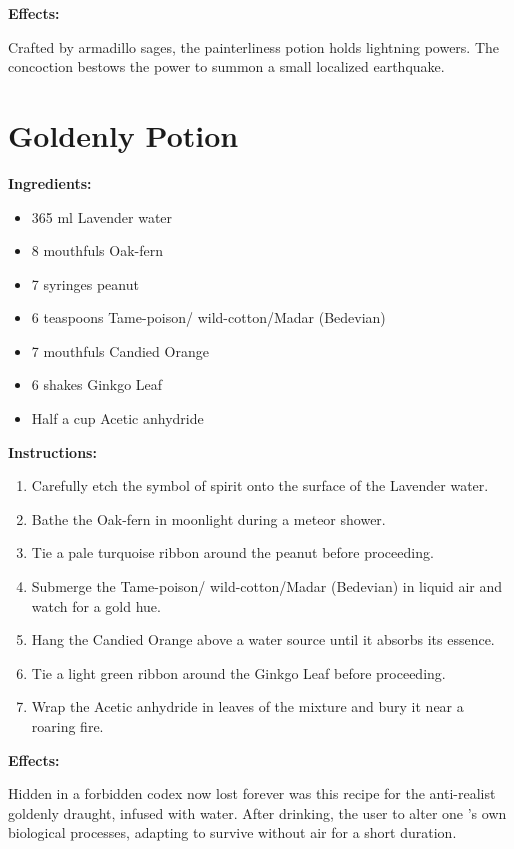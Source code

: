 \documentclass{article}
\begin{document}
\textbf{Effects:}

Crafted by armadillo sages, the painterliness potion holds lightning powers. The concoction bestows the power to summon a small localized earthquake.

\newpage
\section*{Goldenly Potion}

\textbf{Ingredients:}

\begin{itemize}
  \item 365 ml Lavender water
  \item 8 mouthfuls Oak-fern
  \item 7 syringes peanut
  \item 6 teaspoons Tame-poison/ wild-cotton/Madar (Bedevian)
  \item 7 mouthfuls Candied Orange
  \item 6 shakes Ginkgo Leaf
  \item Half a cup Acetic anhydride
\end{itemize}

\textbf{Instructions:}

\begin{enumerate}
  \item Carefully etch the symbol of spirit onto the surface of the Lavender water.
  \item Bathe the Oak-fern in moonlight during a meteor shower.
  \item Tie a pale turquoise ribbon around the peanut before proceeding.
  \item Submerge the Tame-poison/ wild-cotton/Madar (Bedevian) in liquid air and watch for a gold hue.
  \item Hang the Candied Orange above a water source until it absorbs its essence.
  \item Tie a light green ribbon around the Ginkgo Leaf before proceeding.
  \item Wrap the Acetic anhydride in leaves of the mixture and bury it near a roaring fire.
\end{enumerate}

\textbf{Effects:}

Hidden in a forbidden codex now lost forever was this recipe for the anti-realist goldenly draught, infused with water. After drinking, the user to alter one 's own biological processes, adapting to survive without air for a short duration.
\end{document}
